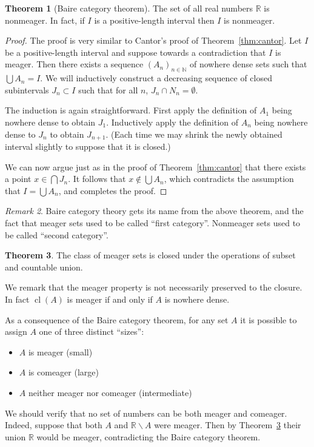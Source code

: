 \documentclass[11pt,oneside]{amsart}
\DeclareMathOperator{\cl}{cl}
\newcommand{\NN}{\mathbb N}
\newcommand{\RR}{\mathbb R}
\theoremstyle{definition}
\newtheorem{thm}{Theorem}[section]
\theoremstyle{definition}
\theoremstyle{remark}
\newtheorem{rem}[thm]{Remark}
\begin{document}
\begin{thm}[Baire category theorem]
  \label{thm:baire}
  The set of all real numbers $\RR$ is nonmeager. In fact, if $I$ is a positive-length interval then $I$ is nonmeager.
\end{thm}

\begin{proof}
  The proof is very similar to Cantor's proof of Theorem~\ref{thm:cantor}. Let $I$ be a positive-length interval and suppose towards a contradiction that $I$ is meager. Then there exists a sequence $(A_n)_{n\in\NN}$ of nowhere dense sets such that $\bigcup A_n=I$. We will inductively construct a decreasing sequence of closed subintervals $J_n\subset I$ such that for all $n$, $J_n\cap N_n=\emptyset$.

  The induction is again straightforward. First apply the definition of $A_1$ being nowhere dense to obtain $J_1$. Inductively apply the definition of $A_n$ being nowhere dense to $J_n$ to obtain $J_{n+1}$. (Each time we may shrink the newly obtained interval slightly to suppose that it is closed.)

  We can now argue just as in the proof of Theorem~\ref{thm:cantor} that there exists a point $x\in\bigcap J_n$. It follows that $x\notin\bigcup A_n$, which contradicts the assumption that $I=\bigcup A_n$, and completes the proof.
\end{proof}

\begin{rem}
  Baire category theory gets its name from the above theorem, and the fact that meager sets used to be called ``first category''. Nonmeager sets used to be called ``second category''.
\end{rem}

\begin{thm}
  \label{thm:meager-pres}
  The class of meager sets is closed under the operations of subset and countable union.
\end{thm}

We remark that the meager property is not necessarily preserved to the closure. In fact $\cl(A)$ is meager if and only if $A$ is nowhere dense.

As a consequence of the Baire category theorem, for any set $A$ it is possible to assign $A$ one of three distinct ``sizes'':
\begin{itemize}
\item $A$ is meager (small)
\item $A$ is comeager (large)
\item $A$ neither meager nor comeager (intermediate)
\end{itemize}
We should verify that no set of numbers can be both meager and comeager. Indeed, suppose that both $A$ and $\RR\smallsetminus A$ were meager. Then by Theorem~\ref{thm:meager-pres} their union $\RR$ would be meager, contradicting the Baire category theorem.
\end{document}
